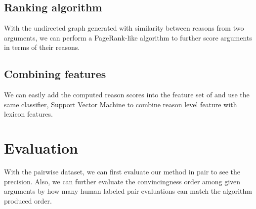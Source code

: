 \documentclass[11pt,a4paper]{article}
\begin{document}
\subsection{Ranking algorithm}

With the undirected graph generated with similarity between reasons from two arguments, we can perform a PageRank-like algorithm to further score arguments in terms of their reasons\cite{grolmusz2015note}. 

\subsection{Combining features}

We can easily add the computed reason scores into the feature set of \cite{habernal2016argument} and use the same classifier, Support Vector Machine to combine reason level feature with lexicon features. 


\section{Evaluation}

With the pairwise dataset, we can first evaluate our method in pair to see the precision. Also, we can further evaluate the convincingness order among given arguments by how many human labeled pair evaluations can match the algorithm produced order. 



% 
%


\end{document}
